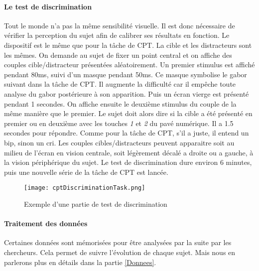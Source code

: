 \paragraph{Le test de discrimination}Tout le monde n'a pas la même sensibilité visuelle. Il est donc nécessaire de vérifier la perception du sujet afin de calibrer ses résultats en
fonction. Le dispositif est le même que pour la tâche de CPT. La cible et les distracteurs sont les mêmes. On demande au sujet de fixer un point central et on affiche des couples
cible/distracteur présentées aléatoirement. Un premier stimulus est affiché pendant 80ms, suivi d'un masque pendant 50ms. Ce masque symbolise le gabor suivant dans la tâche de CPT. Il
augmente la difficulté car il empêche toute analyse du gabor postérieure à son apparition. Puis un écran vierge est présenté pendant 1 secondes. On affiche ensuite le deuxième stimulus
du couple de la même manière que le premier. Le sujet doit alors dire si la cible a été présenté en premier ou en deuxième avec les touches \emph{1} et \emph{2} du pavé numérique.
Il a 1.5 secondes pour répondre. Comme pour la tâche de CPT, s'il a juste, il entend un bip, sinon un cri. Les couples cibles/distracteurs peuvent apparaitre soit au milieu de l'écran
en vision centrale, soit légèrement décalé a droite ou a gauche, à la vision périphérique du sujet. Le test de discrimination dure environ 6 minutes, puis une nouvelle série de la
tâche de CPT est lancée.

\begin{figure}[H]
    \begin{center}
    \texttt{[image: cptDiscriminationTask.png]}
    \end{center}
    \caption{Exemple d'une partie de test de discrimination}
\label{CptDiscriminationTask}
\end{figure}


\paragraph{Traitement des données}Certaines données sont mémorisées pour être analysées par la suite par les chercheurs. Cela permet de suivre l'évolution de chaque sujet. Mais nous
en parlerons plus en détails dans la partie \ref{Donnees}.
